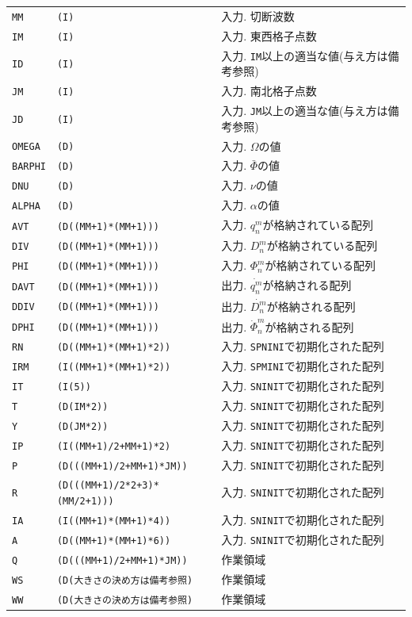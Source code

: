 \documentclass[a4j,fleqn]{jarticle}
\begin{document}
\begin{enumerate}
\begin{tabular}{lll}
{\tt MM} & {\tt (I)} & 入力. 切断波数\\
{\tt IM} & {\tt (I)} & 入力. 東西格子点数\\
{\tt ID} & {\tt (I)} & 入力. {\tt IM}以上の適当な値(与え方は備考参照)\\
{\tt JM} & {\tt (I)} & 入力. 南北格子点数\\
{\tt JD} & {\tt (I)} & 入力. {\tt JM}以上の適当な値(与え方は備考参照)\\
{\tt OMEGA} & {\tt (D)} 
& 入力. $\Omega$の値\\
{\tt BARPHI} & {\tt (D)} 
& 入力. $\bar\Phi$の値\\
{\tt DNU} & {\tt (D)} 
& 入力. $\nu$の値\\
{\tt ALPHA} & {\tt (D)} 
& 入力. $\alpha$の値\\
{\tt AVT} & {\tt (D((MM+1)*(MM+1)))} 
& 入力. $q^m_n$が格納されている配列\\
{\tt DIV} & {\tt (D((MM+1)*(MM+1)))} 
& 入力. $D^m_n$が格納されている配列\\
{\tt PHI} & {\tt (D((MM+1)*(MM+1)))} 
& 入力. $\Phi^m_n$が格納されている配列\\
{\tt DAVT} & {\tt (D((MM+1)*(MM+1)))} 
& 出力. $\dot{q^m_n}$が格納される配列\\
{\tt DDIV} & {\tt (D((MM+1)*(MM+1)))} 
& 出力. $\dot{D^m_n}$が格納される配列\\
{\tt DPHI} & {\tt (D((MM+1)*(MM+1)))} 
& 出力. $\dot{\Phi}^m_n$が格納される配列\\
{\tt RN} & {\tt (D((MM+1)*(MM+1)*2))} 
& 入力. {\tt SPNINI}で初期化された配列\\
{\tt IRM} & {\tt (I((MM+1)*(MM+1)*2))} 
& 入力. {\tt SPMINI}で初期化された配列\\
{\tt IT}  & {\tt (I(5))}    & 入力. {\tt SNINIT}で初期化された配列\\
{\tt T}   & {\tt (D(IM*2))} & 入力. {\tt SNINIT}で初期化された配列\\
{\tt Y}   & {\tt (D(JM*2))} & 入力. {\tt SNINIT}で初期化された配列\\
{\tt IP}  & {\tt (I((MM+1)/2+MM+1)*2)} 
             & 入力. {\tt SNINIT}で初期化された配列\\
{\tt P}  & {\tt (D(((MM+1)/2+MM+1)*JM))} 
             & 入力. {\tt SNINIT}で初期化された配列\\
{\tt R}  & {\tt (D(((MM+1)/2*2+3)*(MM/2+1)))}
             & 入力. {\tt SNINIT}で初期化された配列\\
{\tt IA}  & {\tt (I((MM+1)*(MM+1)*4))}
             & 入力. {\tt SNINIT}で初期化された配列\\
{\tt A}  & {\tt (D((MM+1)*(MM+1)*6))}
             & 入力. {\tt SNINIT}で初期化された配列\\
{\tt Q}  & {\tt (D(((MM+1)/2+MM+1)*JM))} 
             & 作業領域\\
{\tt WS}  & {\tt (D(大きさの決め方は備考参照)} & 作業領域\\
{\tt WW}  & {\tt (D(大きさの決め方は備考参照)} & 作業領域
\end{tabular}


\end{enumerate}
\end{document}
